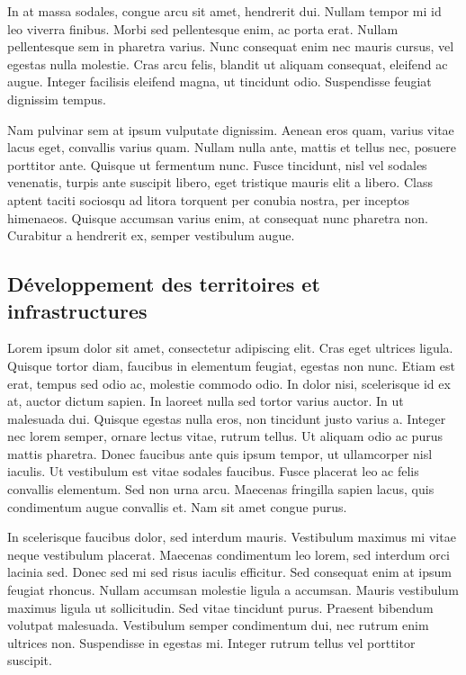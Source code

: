 \documentclass{report}
\begin{document}
In at massa sodales, congue arcu sit amet, hendrerit dui. Nullam tempor mi id leo viverra finibus. Morbi sed pellentesque enim, ac porta erat. Nullam pellentesque sem in pharetra varius. Nunc consequat enim nec mauris cursus, vel egestas nulla molestie. Cras arcu felis, blandit ut aliquam consequat, eleifend ac augue. Integer facilisis eleifend magna, ut tincidunt odio. Suspendisse feugiat dignissim tempus.

Nam pulvinar sem at ipsum vulputate dignissim. Aenean eros quam, varius vitae lacus eget, convallis varius quam. Nullam nulla ante, mattis et tellus nec, posuere porttitor ante. Quisque ut fermentum nunc. Fusce tincidunt, nisl vel sodales venenatis, turpis ante suscipit libero, eget tristique mauris elit a libero. Class aptent taciti sociosqu ad litora torquent per conubia nostra, per inceptos himenaeos. Quisque accumsan varius enim, at consequat nunc pharetra non. Curabitur a hendrerit ex, semper vestibulum augue.

\subsection{Développement des territoires et infrastructures}

Lorem ipsum dolor sit amet, consectetur adipiscing elit. Cras eget ultrices ligula. Quisque tortor diam, faucibus in elementum feugiat, egestas non nunc. Etiam est erat, tempus sed odio ac, molestie commodo odio. In dolor nisi, scelerisque id ex at, auctor dictum sapien. In laoreet nulla sed tortor varius auctor. In ut malesuada dui. Quisque egestas nulla eros, non tincidunt justo varius a. Integer nec lorem semper, ornare lectus vitae, rutrum tellus. Ut aliquam odio ac purus mattis pharetra. Donec faucibus ante quis ipsum tempor, ut ullamcorper nisl iaculis. Ut vestibulum est vitae sodales faucibus. Fusce placerat leo ac felis convallis elementum. Sed non urna arcu. Maecenas fringilla sapien lacus, quis condimentum augue convallis et. Nam sit amet congue purus.

In scelerisque faucibus dolor, sed interdum mauris. Vestibulum maximus mi vitae neque vestibulum placerat. Maecenas condimentum leo lorem, sed interdum orci lacinia sed. Donec sed mi sed risus iaculis efficitur. Sed consequat enim at ipsum feugiat rhoncus. Nullam accumsan molestie ligula a accumsan. Mauris vestibulum maximus ligula ut sollicitudin. Sed vitae tincidunt purus. Praesent bibendum volutpat malesuada. Vestibulum semper condimentum dui, nec rutrum enim ultrices non. Suspendisse in egestas mi. Integer rutrum tellus vel porttitor suscipit.
\end{document}
